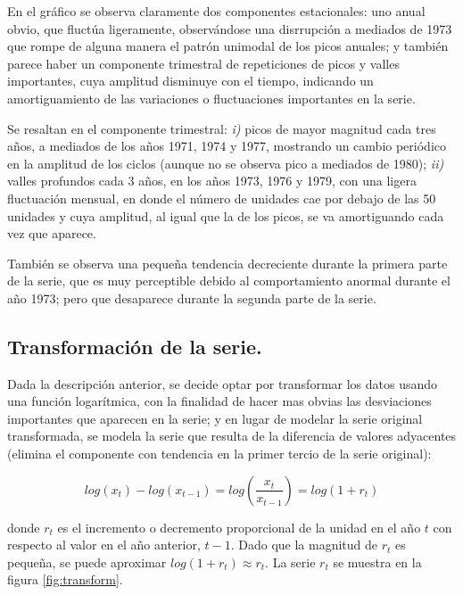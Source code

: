 \documentclass[]{article}
\begin{document}
En el gráfico se observa claramente dos componentes estacionales: uno anual obvio, que fluctúa ligeramente, observándose una disrrupción a mediados de 1973 que rompe de alguna manera el patrón unimodal de los picos anuales; y también parece haber un componente trimestral de repeticiones de picos y valles importantes, cuya amplitud disminuye con el tiempo, indicando un amortiguamiento de las variaciones o fluctuaciones importantes en la serie.

Se resaltan en el componente trimestral:
\emph{i)} picos de mayor magnitud cada tres años, a mediados de los años 1971, 1974 y 1977, mostrando un cambio periódico en la amplitud de los ciclos (aunque no se observa pico a mediados de 1980);
\emph{ii)} valles profundos cada 3 años, en los años 1973, 1976 y 1979, con una ligera fluctuación mensual, en donde el número de unidades cae por debajo de las 50 unidades y cuya amplitud, al igual que la de los picos, se va amortiguando cada vez que aparece.

También se observa una pequeña tendencia decreciente durante la primera parte de la serie, que es muy perceptible debido al comportamiento anormal durante el año 1973; pero que desaparece durante la segunda parte de la serie.

\hypertarget{transformaciuxf3n-de-la-serie.}{%
\subsection{Transformación de la serie.}\label{transformaciuxf3n-de-la-serie.}}

Dada la descripción anterior, se decide optar por transformar los datos usando una función logarítmica, con la finalidad de hacer mas obvias las desviaciones importantes que aparecen en la serie; y en lugar de modelar la serie original transformada, se modela la serie que resulta de la diferencia de valores adyacentes (elimina el componente con tendencia en la primer tercio de la serie original):

\[log(x_t) - log(x_{t-1}) = log(\frac{x_t}{x_{t-1}}) = log(1 + r_t)\]

donde \(r_t\) es el incremento o decremento proporcional de la unidad en el año \(t\) con respecto al valor en el año anterior, \(t-1\). Dado que la magnitud de \(r_t\) es pequeña, se puede aproximar \(log(1 + r_t) \approx r_t\). La serie \(r_t\) se muestra en la figura \ref{fig:transform}.
\end{document}

